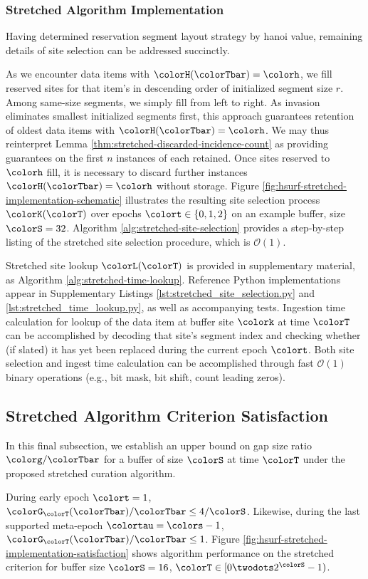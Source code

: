 \subsubsection{Stretched Algorithm Implementation}
\label{sec:stretched-implementation}

Having determined reservation segment layout strategy by hanoi value, remaining details of site selection can be addressed succinctly.

As we encounter data items with $\colorH(\colorTbar) = \colorh$, we fill reserved sites for that item's \hv{} in descending order of initialized segment size $r$.
Among same-size segments, we simply fill from left to right.
As invasion eliminates smallest initialized segments first, this approach guarantees retention of oldest data items with $\colorH(\colorTbar) = \colorh$.
We may thus reinterpret Lemma \ref{thm:stretched-discarded-incidence-count} as providing guarantees on the first $n$ instances of each \hv{} retained.
Once sites reserved to \hv{} $\colorh$ fill, it is necessary to discard further instances $\colorH(\colorTbar) = \colorh$ without storage.
Figure \ref{fig:hsurf-stretched-implementation-schematic} illustrates the resulting site selection process $\colorK(\colorT)$ over epochs $\colort \in \{0,1,2\}$ on an example buffer, size $\colorS=32$.
Algorithm \ref{alg:stretched-site-selection} provides a step-by-step listing of the stretched site selection procedure, which is $\mathcal{O}(1)$.



Stretched site lookup $\colorL(\colorT)$ is provided in supplementary material, as Algorithm \ref{alg:stretched-time-lookup}.
Reference Python implementations appear in Supplementary Listings \ref{lst:stretched_site_selection.py} and \ref{lst:stretched_time_lookup.py}, as well as accompanying tests.
Ingestion time calculation for lookup of the data item at buffer site $\colork$ at time $\colorT$ can be accomplished by decoding that site's segment index and checking whether (if slated) it has yet been replaced during the current epoch $\colort$.
Both site selection and ingest time calculation can be accomplished through fast $\mathcal{O}(1)$ binary operations (e.g., bit mask, bit shift, count leading zeros).

\subsection{Stretched Algorithm Criterion Satisfaction}
\label{sec:stretched-satisfaction}

In this final subsection, we establish an upper bound on gap size ratio $\colorg / \colorTbar$ for a buffer of size $\colorS$ at time $\colorT$ under the proposed stretched curation algorithm.



During early epoch $\colort = 1$, $\colorG_{\colorT}(\colorTbar)/\colorTbar \leq 4/\colorS$.
Likewise, during the last supported meta-epoch $\colortau = \colors - 1$, $\colorG_{\colorT}(\colorTbar)/\colorTbar \leq 1$.
Figure \ref{fig:hsurf-stretched-implementation-satisfaction} shows algorithm performance on the stretched criterion for buffer size $\colorS=16$, $\colorT \in [0\twodots 2^{\colorS} - 1)$.
